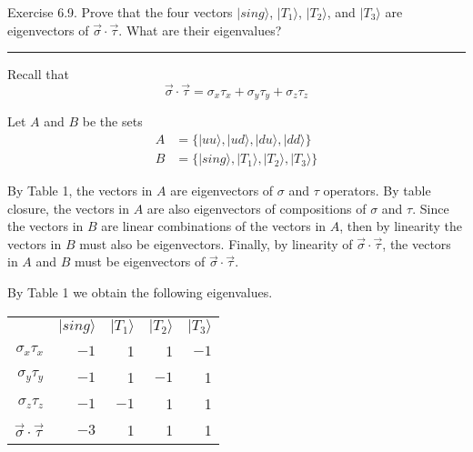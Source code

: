 \documentclass[12pt]{article}
\begin{document}
Exercise 6.9.
Prove that the four vectors $|sing\rangle$, $|T_1\rangle$,
$|T_2\rangle$, and $|T_3\rangle$ are eigenvectors of
$\vec\sigma\cdot\vec\tau$.
What are their eigenvalues?

\bigskip
\hrule

\bigskip
Recall that
\begin{equation*}
\vec\sigma\cdot\vec\tau=\sigma_x\tau_x+\sigma_y\tau_y+\sigma_z\tau_z
\end{equation*}

Let $A$ and $B$ be the sets
\begin{align*}
A&=\{|uu\rangle, |ud\rangle, |du\rangle, |dd\rangle\}
\\
B&=\{|sing\rangle, |T_1\rangle, |T_2\rangle, |T_3\rangle\}
\end{align*}

By Table 1, the vectors in $A$ are eigenvectors of $\sigma$ and $\tau$ operators.
By table closure, the vectors in $A$ are also eigenvectors of compositions of $\sigma$ and $\tau$.
Since the vectors in $B$ are linear combinations of the vectors in $A$,
then by linearity the vectors in $B$ must also be eigenvectors.
Finally, by linearity of $\vec\sigma\cdot\vec\tau$, the vectors in $A$ and $B$ must
be eigenvectors of $\vec\sigma\cdot\vec\tau$.

\bigskip
By Table 1 we obtain the following eigenvalues.
\begin{center}
\begin{tabular}{rrrrr}
& $|sing\rangle$ & $|T_1\rangle$ & $|T_2\rangle$ & $|T_3\rangle$
\\[1ex]
$\sigma_x\tau_x$ & $-1$ & 1 & 1 & $-1$
\\
$\sigma_y\tau_y$ & $-1$ & 1 & $-1$ & 1
\\
$\sigma_z\tau_z$ & $-1$ & $-1$ & 1 & 1
\\[1ex]
$\vec\sigma\cdot\vec\tau$ & $-3$ & 1 & 1 & 1
\end{tabular}
\end{center}
\end{document}
